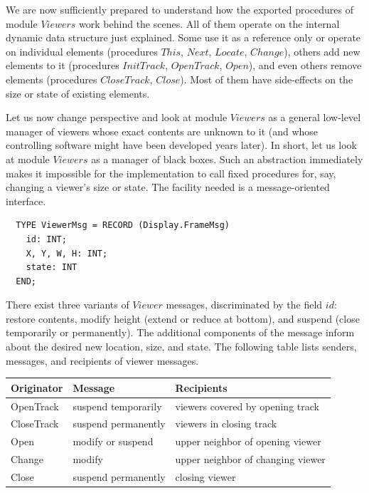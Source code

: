 We are now sufficiently prepared to understand how the exported procedures of module $Viewers$
work behind the scenes. All of them operate on the internal dynamic data structure just explained.
Some use it as a reference only or operate on individual elements (procedures $This$,
$Next$, $Locate$, $Change$), others add new elements to it (procedures $InitTrack$,
$OpenTrack$, $Open$), and even others remove elements (procedures $CloseTrack$, $Close$). Most
of them have side-effects on the size or state of existing elements.

Let us now change perspective and look at module $Viewers$ as a general low-level manager of
viewers whose exact contents are unknown to it (and whose controlling software might have been
developed years later). In short, let us look at module $Viewers$ as a manager of black boxes. Such
an abstraction immediately makes it impossible for the implementation to call fixed procedures for,
say, changing a viewer's size or state. The facility needed is a message-oriented interface.
\begin{verbatim}
  TYPE ViewerMsg = RECORD (Display.FrameMsg)
    id: INT;
    X, Y, W, H: INT;
    state: INT
  END;
\end{verbatim}

There exist three variants of $Viewer$ messages, discriminated by the field $id$: restore contents,
modify height (extend or reduce at bottom), and suspend (close temporarily or permanently). The
additional components of the message inform about the desired new location, size, and state.
The following table lists senders, messages, and recipients of viewer messages.
\begin{table}[h!]
	\setlength{\tabcolsep}{1pt}
	\begin{tabular}{l|l|l}
		Originator         &Message                 &Recipients \\\hline
		{\small OpenTrack }&{\small suspend temporarily}
		                   &{\small viewers covered by opening track }\\
		{\small CloseTrack}&{\small suspend permanently}
		                   &{\small viewers in closing track         }\\
		{\small Open      }&{\small modify or suspend  }
		                   &{\small upper neighbor of opening viewer }\\
		{\small Change    }&{\small modify             }
		                   &{\small upper neighbor of changing viewer}\\
		{\small Close     }&{\small suspend permanently}
		                   &{\small closing viewer                   }
	\end{tabular}
\end{table}

